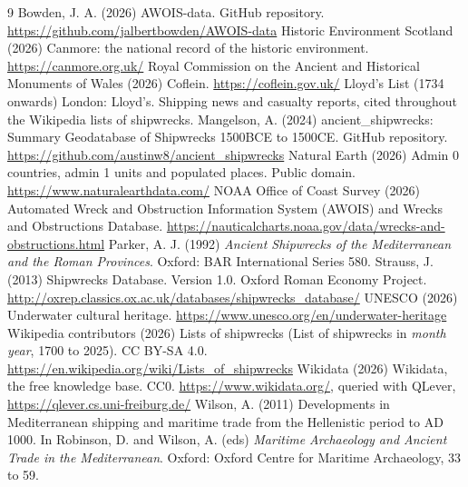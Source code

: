 \documentclass[11pt,a4paper]{article}
\begin{document}
\begin{thebibliography}{9}
 Bowden, J. A. (2026) AWOIS-data. GitHub repository. \url{https://github.com/jalbertbowden/AWOIS-data}
 Historic Environment Scotland (2026) Canmore: the national record of the historic environment. \url{https://canmore.org.uk/}
 Royal Commission on the Ancient and Historical Monuments of Wales (2026) Coflein. \url{https://coflein.gov.uk/}
 Lloyd's List (1734 onwards) London: Lloyd's. Shipping news and casualty reports, cited throughout the Wikipedia lists of shipwrecks.
 Mangelson, A. (2024) ancient\_shipwrecks: Summary Geodatabase of Shipwrecks 1500BCE to 1500CE. GitHub repository. \url{https://github.com/austinw8/ancient_shipwrecks}
 Natural Earth (2026) Admin 0 countries, admin 1 units and populated places. Public domain. \url{https://www.naturalearthdata.com/}
 NOAA Office of Coast Survey (2026) Automated Wreck and Obstruction Information System (AWOIS) and Wrecks and Obstructions Database. \url{https://nauticalcharts.noaa.gov/data/wrecks-and-obstructions.html}
 Parker, A. J. (1992) \emph{Ancient Shipwrecks of the Mediterranean and the Roman Provinces}. Oxford: BAR International Series 580.
 Strauss, J. (2013) Shipwrecks Database. Version 1.0. Oxford Roman Economy Project. \url{http://oxrep.classics.ox.ac.uk/databases/shipwrecks_database/}
 UNESCO (2026) Underwater cultural heritage. \url{https://www.unesco.org/en/underwater-heritage}
 Wikipedia contributors (2026) Lists of shipwrecks (List of shipwrecks in \emph{month year}, 1700 to 2025). CC BY-SA 4.0. \url{https://en.wikipedia.org/wiki/Lists_of_shipwrecks}
 Wikidata (2026) Wikidata, the free knowledge base. CC0. \url{https://www.wikidata.org/}, queried with QLever, \url{https://qlever.cs.uni-freiburg.de/}
 Wilson, A. (2011) Developments in Mediterranean shipping and maritime trade from the Hellenistic period to AD 1000. In Robinson, D. and Wilson, A. (eds) \emph{Maritime Archaeology and Ancient Trade in the Mediterranean}. Oxford: Oxford Centre for Maritime Archaeology, 33 to 59.
\end{thebibliography}
\end{document}
